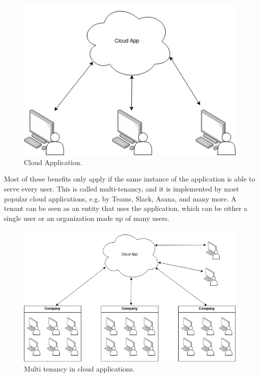\begin{figure}[H]
    \centering
    \includegraphics[scale=0.4]{images/basic-cloud-services.drawio.png}
    \caption{Cloud Application.}
    \label{fig:cloud-applications}
\end{figure}

Most of these benefits only apply if the same instance of the application is able to serve every user.
This is called multi-tenancy, and it is implemented by most popular cloud applications, e.g. by Teams, Slack, Asana, and many more.
A tenant can be seen as an entity that uses the application, which can be either a single user or an organization made up of many users.

\begin{figure}[H]
    \centering
    \includegraphics[scale=0.45]{images/mt-cloud-services.png}
    \caption{Multi tenancy in cloud applications.}
    \label{fig:multi-tenant=cloud-applications}
\end{figure}


